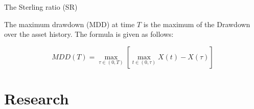 \documentclass{pracamgr_wne}\usepackage[]{graphicx}\usepackage[]{color}
\begin{document}
The Sterling ratio (SR)


The maximum drawdown (MDD) at time $T$ is the maximum of the Drawdown over the asset history. The formula is given as follows:

\begin{equation}
MDD(T)=\max_{\tau\in (0,T)}[\max_{t\in (0,\tau)} X(t)-X(\tau)]
\end{equation}

\chapter{Research}




\printbibliography


\listoffigures
\listoftables
\end{document}
